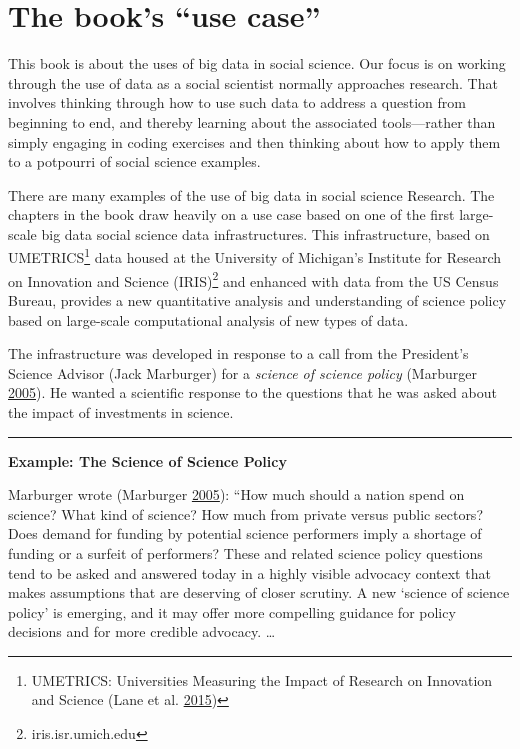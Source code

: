 \documentclass[]{krantz}
\begin{document}
\section{\texorpdfstring{The book's ``use
case''}{The book's use case}}\label{sec:1-6}

This book is about the uses of big data in social science. Our focus is
on working through the use of data as a social scientist normally
approaches research. That involves thinking through how to use such data
to address a question from beginning to end, and thereby learning about
the associated tools---rather than simply engaging in coding exercises
and then thinking about how to apply them to a potpourri of social
science examples.

There are many examples of the use of big data in social science
Research. The chapters in the book draw heavily on a use case based on
one of the first large-scale big data social science data
infrastructures. This infrastructure, based on UMETRICS\footnote{UMETRICS:
  Universities Measuring the Impact of Research on Innovation and
  Science (Lane et al. \protect\hyperlink{ref-lane2015new}{2015})} data
housed at the University of Michigan's Institute for Research on
Innovation and Science (IRIS)\footnote{iris.isr.umich.edu} and enhanced
with data from the US Census Bureau, provides a new quantitative
analysis and understanding of science policy based on large-scale
computational analysis of new types of data.

The infrastructure was developed in response to a call from the
President's Science Advisor (Jack Marburger) for a \emph{science of
science policy} (Marburger
\protect\hyperlink{ref-marburger2005wanted}{2005}). He wanted a
scientific response to the questions that he was asked about the impact
of investments in science.

\begin{center}\rule{0.5\linewidth}{\linethickness}\end{center}

\textbf{Example: The Science of Science Policy}

Marburger wrote (Marburger
\protect\hyperlink{ref-marburger2005wanted}{2005}): ``How much should a
nation spend on science? What kind of science? How much from private
versus public sectors? Does demand for funding by potential science
performers imply a shortage of funding or a surfeit of performers? These
and related science policy questions tend to be asked and answered today
in a highly visible advocacy context that makes assumptions that are
deserving of closer scrutiny. A new `science of science policy' is
emerging, and it may offer more compelling guidance for policy decisions
and for more credible advocacy. \ldots{}
\end{document}

